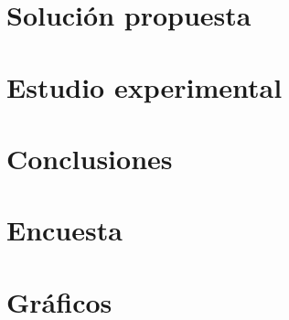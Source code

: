 \documentclass[11pt,letterpaper,twoside,openright]{report}
\begin{document}
\chapter{Solución propuesta}
\label{ch:solucion}
    

\chapter{Estudio experimental}
\label{ch:estudio}
    

\chapter{Conclusiones}
\label{ch:conclusiones}
    

\singlespacing



\appendix
\chapter{Encuesta}
\label{ch:anexos}
    
\chapter{Gráficos}
\label{ch:anexos}
    
\end{document}

